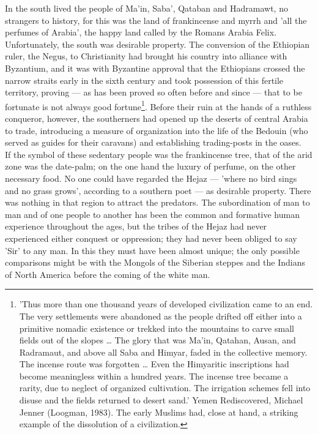 \documentclass[11pt, b5paper, twoside]{book}
\begin{document}
In the south lived the people of Ma'in, Saba', Qataban and Hadramawt, no strangers to history, for 
this was the land of frankincense and myrrh and 'all the perfumes of Arabia', the happy land called 
by the Romans Arabia Felix. Unfortunately, the south was desirable property. The conversion of the 
Ethiopian ruler, the Negus, to Christianity had brought his country into alliance with Byzantium, and 
it was with Byzantine approval that the Ethiopians crossed the narrow straits early in the sixth 
century and took possession of this fertile territory, proving --- as has been proved so often before 
and since --- that to be fortunate is not always good fortune\footnote{'Thus more than one thousand years of developed civilization came to an end. The very settlements were abandoned as the people drifted off either into a primitive nomadic existence or trekked into the mountains to carve small fields out of the slopes \ldots{} The glory that was Ma'in, Qatahan, Ausan, and Radramaut, and above all Saba and Himyar, faded in the collective memory. The incense route was forgotten \ldots{} Even the Himyaritic inscriptions had become meaningless within a hundred years. The incense tree became a rarity, due to neglect of organized cultivation. The irrigation schemes fell into disuse and the fields returned to desert sand.' Yemen Rediscovered, Michael Jenner (Loogman, 1983). The early Muslims had, close at hand, a striking example of the dissolution of a civilization.}. Before their ruin at the hands of a 
ruthless conqueror, however, the southerners had opened up the deserts of central Arabia to trade, 
introducing a measure of organization into the life of the Bedouin (who served as guides for their 
caravans) and establishing trading-posts in the oases. \\

If the symbol of these sedentary people was the frankincense tree, that of the arid zone was the 
date-palm; on the one hand the luxury of perfume, on the other necessary food. No one could have 
regarded the Hejaz --- 'where no bird sings and no grass grows', according to a southern poet --- as 
desirable property. There was nothing in that region to attract the predators. The subordination of 
man to man and of one people to another has been the common and formative human experience throughout the ages, but the tribes of the Hejaz had never experienced either conquest or oppression; they had never been obliged to say 'Sir' to any man. In this they must have been almost unique; the only 
possible comparisons might be with the Mongols of the Siberian steppes and the Indians of North 
America before the coming of the white man. \\
\end{document}
